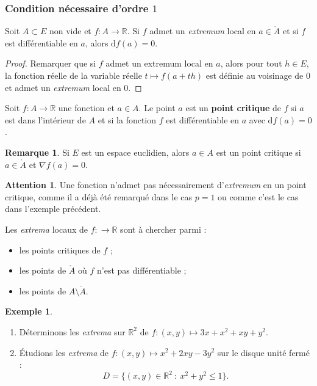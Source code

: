 \documentclass[french]{article}
\newcommand{\R}{\mathbb{R}}
\renewcommand{\d}{\text{d}}
\theoremstyle{plain}
\theoremstyle{definition}
\newtheorem*{ex}{Exemple}
\newtheorem*{rmq}{Remarque}
\newtheorem*{attention}{Attention}
\theoremstyle{remark}
\begin{document}
\subsubsection*{Condition nécessaire d'ordre $1$}

\begin{prop}%
	Soit $A\subset E$ non vide et $f:A\to\R$. Si $f$ admet un \textit{extremum} local en $a\in\mathring{A}$ et si $f$ est différentiable en $a$, alors $\d f(a)=0$.
\end{prop}
\begin{proof}
	Remarquer que si $f$ admet un extremum local en $a$, alors pour tout $h\in E$, la fonction réelle de la variable réelle $t\mapsto f(a+th)$ est définie au voisinage de $0$ et admet un \textit{extremum} local en $0$.
\end{proof}

\begin{dfn}
	Soit $f:A\to\R$ une fonction et $a\in A$. Le point $a$ est un \textbf{point critique} de $f$ si $a$ est dans l'intérieur de $A$ et si la fonction $f$ est différentiable en $a$ avec $\d f(a)=0$.
\end{dfn}

\begin{rmq}
	Si $E$ est un espace euclidien, alors $a\in A$ est un point critique si $a\in\mathring{A}$ et $\nabla f(a)=0$. 
\end{rmq}

\begin{attention}
	Une fonction n'admet pas nécessairement d'\textit{extremum} en un point critique, comme il a déjà été remarqué dans le cas $p=1$ ou comme c'est le cas dans l'exemple précédent.
\end{attention}

\begin{met}
	Les \textit{extrema} locaux de $f:\to\R$ sont à chercher parmi :
	\begin{itemize}
		\item les points critiques de $f$ ;
		\item les points de $\mathring{A}$ où $f$ n'est pas différentiable ;
		\item les points de $A\setminus\mathring{A}$.
	\end{itemize}
\end{met}

\begin{ex}
	\begin{enumerate}
		\item Déterminons les \textit{extrema} sur $\R^2$ de $f:(x,y)\mapsto 3x+x^2+xy+y^2$.
		\item Étudions les \textit{extrema} de $f:(x,y)\mapsto x^2+2xy-3y^2$ sur le disque unité fermé :
		$$D=\{(x,y)\in\R^2\ :\ x^2+y^2\leqslant 1\}.$$
	\end{enumerate}
\end{ex}
\end{document}
